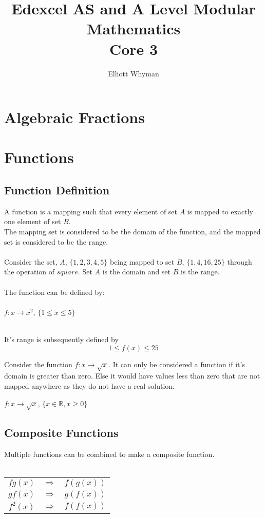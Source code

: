 \documentclass{article}
\begin{document}
	\title{Edexcel AS and A Level Modular Mathematics\\ Core 3}
	\author{Elliott Whyman}
	\maketitle		
	\tableofcontents
	\section{Algebraic Fractions}
	\section{Functions}
	\subsection{Function Definition}
	A function is a mapping such that every element of set $A$ is mapped to exactly one element of set $B$.
	\\  
	The mapping set is considered to be the domain of the function, and the mapped set is considered to be the range.
	\\\\
	Consider the set, $A$, $\{1,2,3,4,5\}$ being mapped to set $B$, $\{1,4,16,25\}$ through the operation of $square$.
	Set $A$ is the domain and set $B$ is the range.
	\\\\
	The function can be defined by:
	\\\\
	 \hfill {$f:x \rightarrow x^2$, $\{1\leq x \leq5\}$} \hspace*{\fill}
	\\\\
	\begin{center}
		It's range is subsequently defined by $$1\leq f(x) \leq 25$$
	\end{center}
	Consider the function $f:x \rightarrow \sqrt{x}$. It can only be considered a function if it's domain is greater than zero. Else it would have values less than zero that are not mapped anywhere as they do not have a real solution.
	\begin{center}
		$f:x \rightarrow \sqrt{x}$, $\{x \in \mathbb{R} , x \geq 0\}$
	\end{center}
	\subsection{Composite Functions}
	Multiple functions can be combined to make a composite function.
	\\\\
	\begin{center}
		\begin{tabular}{ccc}
			$fg(x)$ & $\Rightarrow$ & $f(g(x))$ \\
			$gf(x)$ & $\Rightarrow$ & $g(f(x))$ \\
			$f^2(x)$ & $\Rightarrow$ & $f(f(x))$
		\end{tabular}
	\end{center}
\end{document}
